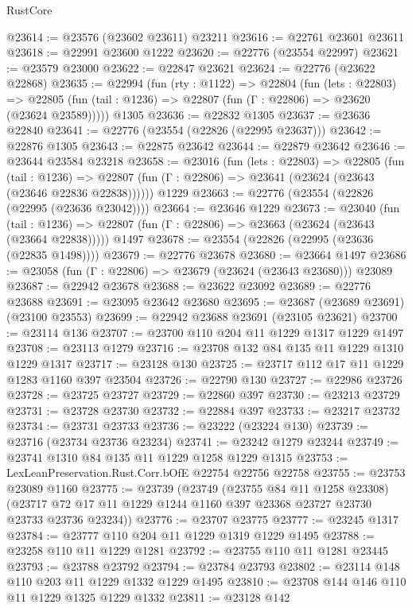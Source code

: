 \begin{lexlean}{RustCore}
\begin{coremodule}
@23614 := @23576 (@23602 @23611) @23211
@23616 := @22761 @23601 @23611
@23618 := @22991 @23600 @1222
@23620 := @22776 (@23554 @22997)
@23621 := @23579 @23000
@23622 := @22847 @23621
@23624 := @22776 (@23622 @22868)
@23635 := @22994
    (fun (rty : @1122) =>
    @22804
      (fun (lets : @22803) =>
      @22805 (fun (tail : @1236) => @22807 (fun (Γ : @22806) => @23620 (@23624 @23589)))))
    @1305
@23636 := @22832 @1305
@23637 := @23636 @22840
@23641 := @22776 (@23554 (@22826 (@22995 @23637)))
@23642 := @22876 @1305
@23643 := @22875 @23642
@23644 := @22879 @23642
@23646 := @23644 @23584 @23218
@23658 := @23016
    (fun (lets : @22803) =>
    @22805
      (fun (tail : @1236) =>
      @22807 (fun (Γ : @22806) => @23641 (@23624 (@23643 (@23646 @22836 @22838))))))
    @1229
@23663 := @22776 (@23554 (@22826 (@22995 (@23636 @23042))))
@23664 := @23646 @1229
@23673 := @23040
    (fun (tail : @1236) => @22807 (fun (Γ : @22806) => @23663 (@23624 (@23643 (@23664 @22838)))))
    @1497
@23678 := @23554 (@22826 (@22995 (@23636 (@22835 @1498))))
@23679 := @22776 @23678
@23680 := @23664 @1497
@23686 := @23058 (fun (Γ : @22806) => @23679 (@23624 (@23643 @23680))) @23089
@23687 := @22942 @23678
@23688 := @23622 @23092
@23689 := @22776 @23688
@23691 := @23095 @23642 @23680
@23695 := @23687 (@23689 @23691) (@23100 @23553)
@23699 := @22942 @23688 @23691 (@23105 @23621)
@23700 := @23114 @136
@23707 := @23700 @110 @204 @11 @1229 @1317 @1229 @1497
@23708 := @23113 @1279
@23716 := @23708 @132 @84 @135 @11 @1229 @1310 @1229 @1317
@23717 := @23128 @130
@23725 := @23717 @112 @17 @11 @1229 @1283 @1160 @397 @23504
@23726 := @22790 @130
@23727 := @22986 @23726
@23728 := @23725 @23727
@23729 := @22860 @397
@23730 := @23213 @23729
@23731 := @23728 @23730
@23732 := @22884 @397
@23733 := @23217 @23732
@23734 := @23731 @23733
@23736 := @23222 (@23224 @130)
@23739 := @23716 (@23734 @23736 @23234)
@23741 := @23242 @1279 @23244
@23749 := @23741 @1310 @84 @135 @11 @1229 @1258 @1229 @1315
@23753 := LexLeanPreservation.Rust.Corr.bOfE @22754 @22756 @22758
@23755 := @23753 @23089 @1160
@23775 := @23739
    (@23749
      (@23755 @84 @11 @1258 @23308)
      (@23717 @72 @17 @11 @1229 @1244 @1160 @397 @23368 @23727 @23730 @23733 @23736 @23234))
@23776 := @23707 @23775
@23777 := @23245 @1317
@23784 := @23777 @110 @204 @11 @1229 @1319 @1229 @1495
@23788 := @23258 @110 @11 @1229 @1281
@23792 := @23755 @110 @11 @1281 @23445
@23793 := @23788 @23792
@23794 := @23784 @23793
@23802 := @23114 @148 @110 @203 @11 @1229 @1332 @1229 @1495
@23810 := @23708 @144 @146 @110 @11 @1229 @1325 @1229 @1332
@23811 := @23128 @142

\end{coremodule}
\end{lexlean}
